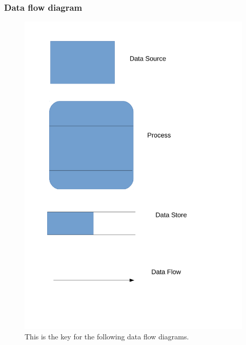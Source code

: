 \subsubsection{Data flow diagram}

\begin{figure}[H]
    \includegraphics[width=\textwidth]{./Analysis/images/key.pdf}
    \caption{This is the key for the following data flow diagrams.} \label{fig:data_flow_diagram_key}
\end{figure}

